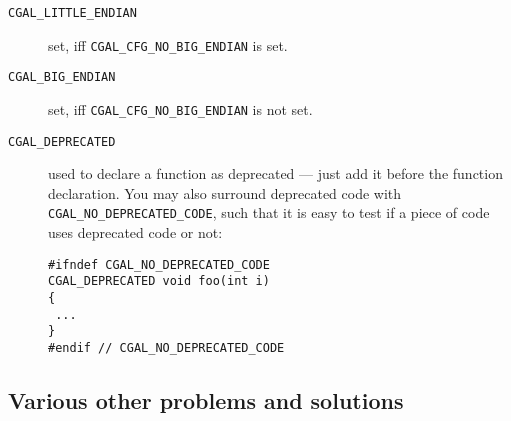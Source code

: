 \begin{description}
\item[\texttt{CGAL\_LITTLE\_ENDIAN}] set, iff
  {\texttt{CGAL\_CFG\_NO\_BIG\_ENDIAN}} is set.
\item[\texttt{CGAL\_BIG\_ENDIAN}] set, iff
  {\texttt{CGAL\_CFG\_NO\_BIG\_ENDIAN}} is not set.

\item[\texttt{CGAL\_DEPRECATED}]
  used to declare a function as deprecated --- just add it before the
  function declaration.  You may also surround deprecated code with
  \texttt{CGAL\_NO\_DEPRECATED\_CODE}, such that it is easy to test
  if a piece of code uses deprecated code or not:
\begin{verbatim}
#ifndef CGAL_NO_DEPRECATED_CODE
CGAL_DEPRECATED void foo(int i)
{
 ...
}
#endif // CGAL_NO_DEPRECATED_CODE
\end{verbatim}
\end{description}


\subsection{Various other problems and solutions\label{sec:various_problems}}

%
%

